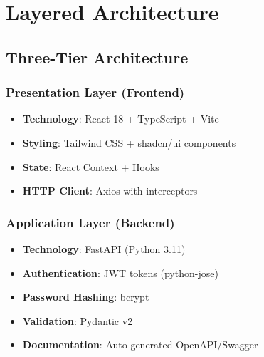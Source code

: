 \documentclass[12pt,a4paper]{report}
\begin{document}
\begin{center}
\end{center}

\chapter{Layered Architecture}

\section{Three-Tier Architecture}

\subsection{Presentation Layer (Frontend)}
\begin{itemize}
    \item \textbf{Technology}: React 18 + TypeScript + Vite
    \item \textbf{Styling}: Tailwind CSS + shadcn/ui components
    \item \textbf{State}: React Context + Hooks
    \item \textbf{HTTP Client}: Axios with interceptors
\end{itemize}

\subsection{Application Layer (Backend)}
\begin{itemize}
    \item \textbf{Technology}: FastAPI (Python 3.11)
    \item \textbf{Authentication}: JWT tokens (python-jose)
    \item \textbf{Password Hashing}: bcrypt
    \item \textbf{Validation}: Pydantic v2
    \item \textbf{Documentation}: Auto-generated OpenAPI/Swagger
\end{itemize}
\end{document}
